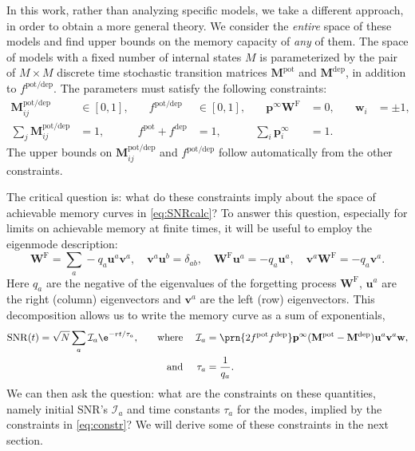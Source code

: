 \documentclass{article} %
\DeclareMathOperator{\snr}{SNR}
\newcommand{\pr}{\mathbf{p}}
\newcommand{\eq}{\pr^\infty}
\newcommand{\w}{\mathbf{w}}
\newcommand{\W}{\mathbf{W}}
\newcommand{\M}{\mathbf{M}}
\newcommand{\frg}{\W^{\mathrm{F}}}
\newcommand{\pot}{^{\text{pot}}}
\newcommand{\dep}{^{\text{dep}}}
\newcommand{\potdep}{^{\text{pot/dep}}}
\newcommand{\uv}{\mathbf{u}}
\newcommand{\vv}{\mathbf{v}}
\newcommand{\CI}{\mathcal{I}}
\begin{document}
In this work, rather than analyzing specific models,  we take a different approach, in order to obtain a more general theory.
We consider the \emph{entire} space of these models and find upper bounds on the memory capacity of \emph{any} of them.
The space of models with a fixed number of internal states $M$ is parameterized by the pair of $M \times M$ discrete time stochastic
transition matrices $\M\pot$ and $\M\dep$, in addition to $f\potdep$.  The parameters must satisfy the following constraints:
%
\begin{equation}\label{eq:constr}
\begin{aligned}
  \M\potdep_{ij} &\in [0,1], &\quad
  f\potdep &\in [0,1], &\quad
  \eq\frg &= 0, &\quad
  \w_i &= \pm 1, \\
  \sum_j \M\potdep_{ij} &= 1, &
  f\pot + f\dep &= 1, &
  \sum_i \eq_i &= 1.
\end{aligned}
\end{equation}
%
The upper bounds on $\M\potdep_{ij}$ and $f\potdep$ follow automatically from the other constraints.

The critical question is: what do these constraints imply about the space of achievable memory curves in \eqref{eq:SNRcalc}?
To answer this question, especially for limits on achievable memory at finite times, it will be useful to employ the eigenmode description:
%
\begin{equation}\label{eq:eigendecomp}
  \frg = \sum_a -q_a \uv^a \vv^a,
  \quad
  \vv^a \uv^b = \delta_{ab},
  \quad
  \frg \uv^a = -q_a \uv^a,
  \quad
  \vv^a \frg = -q_a \vv^a.
\end{equation}
%
Here $q_a$ are the negative of the eigenvalues of the forgetting process $\frg$, $\uv^a$ are the right (column) eigenvectors and $\vv^a$ are the left (row) eigenvectors.
This decomposition allows us to write the memory curve as a sum of exponentials,
%
\begin{equation}\label{eq:SNReigen}
\begin{aligned}
  \snr(t) &= \sqrt{N}\sum_a \CI_a \e^{-rt/\tau_a},
  &\quad \text{where}&\;&
  \CI_a &= \prn{2 f\pot f\dep} \eq (\M\pot-\M\dep) \uv^a  \vv^a \w,\\&
  & \text{and}&&
  \tau_a &= \frac{1}{q_a}.
\end{aligned}
\end{equation}
%
We can then ask the question: what are the constraints on these quantities, namely initial SNR's $\CI_a$ and time constants $\tau_a$ for the modes,  implied by the constraints in \eqref{eq:constr}?
We will derive some of these constraints in the next section.
\end{document}
